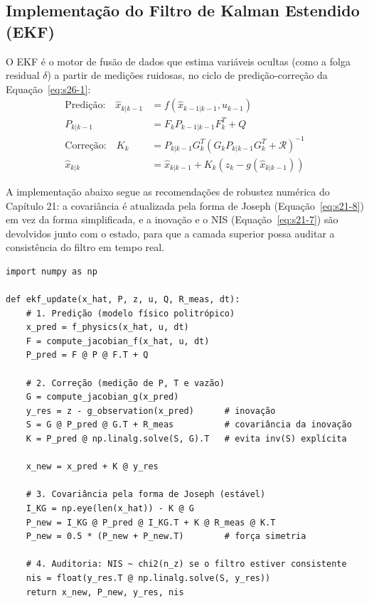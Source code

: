 \documentclass[12pt,a4paper]{article}
\numberwithin{equation}{section}
\numberwithin{table}{section}
\numberwithin{figure}{section}
\begin{document}
{	\subsection{Implementação do Filtro de Kalman Estendido (EKF)}
	O EKF é o motor de fusão de dados que estima variáveis ocultas (como a folga residual $\delta$) a partir de medições ruidosas, no ciclo de predição-correção da Equação~\eqref{eq:s26-1}:
	\begin{equation}\label{eq:s26-1}
	\begin{aligned}
		\text{Predição:} \quad \hat{x}_{k|k-1} &= f(\hat{x}_{k-1|k-1}, u_{k-1}) \\[4pt]
		P_{k|k-1} &= F_k P_{k-1|k-1} F_k^T + Q \\[8pt]
		\text{Correção:} \quad K_k &= P_{k|k-1} G_k^T (G_k P_{k|k-1} G_k^T + \mathcal{R})^{-1} \\[4pt]
		\hat{x}_{k|k} &= \hat{x}_{k|k-1} + K_k (z_k - g(\hat{x}_{k|k-1}))
	\end{aligned}
\end{equation}
	
	A implementação abaixo segue as recomendações de robustez numérica do Capítulo 21: a covariância é atualizada pela forma de Joseph (Equação~\eqref{eq:s21-8}) em vez da forma simplificada, e a inovação e o NIS (Equação~\eqref{eq:s21-7}) são devolvidos junto com o estado, para que a camada superior possa auditar a consistência do filtro em tempo real.

	\begin{verbatim}
import numpy as np

def ekf_update(x_hat, P, z, u, Q, R_meas, dt):
    # 1. Predição (modelo físico politrópico)
    x_pred = f_physics(x_hat, u, dt)
    F = compute_jacobian_f(x_hat, u, dt)
    P_pred = F @ P @ F.T + Q

    # 2. Correção (medição de P, T e vazão)
    G = compute_jacobian_g(x_pred)
    y_res = z - g_observation(x_pred)      # inovação
    S = G @ P_pred @ G.T + R_meas          # covariância da inovação
    K = P_pred @ np.linalg.solve(S, G).T   # evita inv(S) explícita

    x_new = x_pred + K @ y_res

    # 3. Covariância pela forma de Joseph (estável)
    I_KG = np.eye(len(x_hat)) - K @ G
    P_new = I_KG @ P_pred @ I_KG.T + K @ R_meas @ K.T
    P_new = 0.5 * (P_new + P_new.T)        # força simetria

    # 4. Auditoria: NIS ~ chi2(n_z) se o filtro estiver consistente
    nis = float(y_res.T @ np.linalg.solve(S, y_res))
    return x_new, P_new, y_res, nis
\end{verbatim}

}
\end{document}
